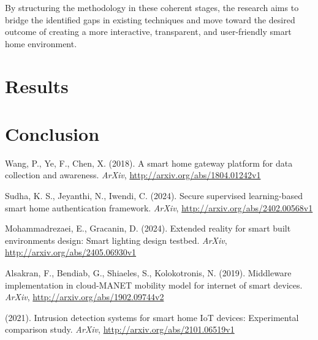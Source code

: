 \documentclass[conference]{IEEEtran}
\begin{document}
By structuring the methodology in these coherent stages, the research aims to bridge the identified gaps in existing techniques and move toward the desired outcome of creating a more interactive, transparent, and user-friendly smart home environment.

\section{Results}


\section{Conclusion}


\begin{thebibliography}{99}

Wang, P., Ye, F., Chen, X. (2018). A smart home gateway platform for data collection and awareness. \textit{ArXiv}, \url{http://arxiv.org/abs/1804.01242v1}

Sudha, K. S., Jeyanthi, N., Iwendi, C. (2024). Secure supervised learning-based smart home authentication framework. \textit{ArXiv}, \url{http://arxiv.org/abs/2402.00568v1}

Mohammadrezaei, E., Gracanin, D. (2024). Extended reality for smart built environments design: Smart lighting design testbed. \textit{ArXiv}, \url{http://arxiv.org/abs/2405.06930v1}

Alsakran, F., Bendiab, G., Shiaeles, S., Kolokotronis, N. (2019). Middleware implementation in cloud-MANET mobility model for internet of smart devices. \textit{ArXiv}, \url{http://arxiv.org/abs/1902.09744v2}

(2021). Intrusion detection systems for smart home IoT devices: Experimental comparison study. \textit{ArXiv}, \url{http://arxiv.org/abs/2101.06519v1}

\end{thebibliography}
\end{document}
